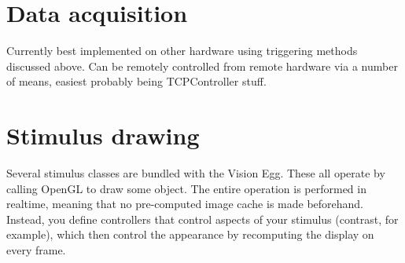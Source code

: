 \section{Data acquisition}

Currently best implemented on other hardware using triggering methods
discussed above.  Can be remotely controlled from remote hardware via
a number of means, easiest probably being TCPController stuff.

\section{Stimulus drawing}

Several stimulus classes are bundled with the Vision Egg.  These all
operate by calling OpenGL to draw some object.  The entire operation
is performed in realtime, meaning that no pre-computed image cache is
made beforehand.  Instead, you define controllers that control aspects
of your stimulus (contrast, for example), which then control the
appearance by recomputing the display on every frame.
